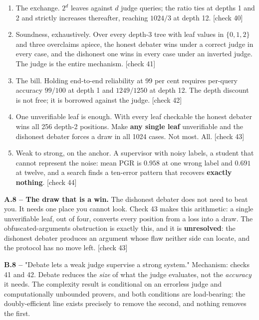 \begin{enumerate}
\item The exchange. $2^d$ leaves against $d$ judge queries; the ratio ties at depths 1 and 2 and strictly increases thereafter, reaching $1024/3$ at depth 12. [check 40]
\item Soundness, exhaustively. Over every depth-3 tree with leaf values in $\{0,1,2\}$ and three overclaims apiece, the honest debater wins under a correct judge in every case, and the dishonest one wins in every case under an inverted judge. The judge is the entire mechanism. [check 41]
\item The bill. Holding end-to-end reliability at 99 per cent requires per-query accuracy $99/100$ at depth 1 and $1249/1250$ at depth 12. The depth discount is not free; it is borrowed against the judge. [check 42]
\item One unverifiable leaf is enough. With every leaf checkable the honest debater wins all 256 depth-2 positions. Make \textbf{any single leaf} unverifiable and the dishonest debater forces a draw in all 1024 cases. Not most. All. [check 43]
\item Weak to strong, on the anchor. A supervisor with noisy labels, a student that cannot represent the noise: mean PGR is $0.958$ at one wrong label and $0.691$ at twelve, and a search finds a ten-error pattern that recovers \textbf{exactly nothing}. [check 44]
\end{enumerate}


\textbf{A.8 -- The draw that is a win.} The dishonest debater does not need to beat you. It needs one place you cannot look. Check 43 makes this arithmetic: a single unverifiable leaf, out of four, converts every position from a loss into a draw. The obfuscated-arguments obstruction is exactly this, and it is \textbf{unresolved}: the dishonest debater produces an argument whose flaw neither side can locate, and the protocol has no move left. [check 43]

\textbf{B.8 --} "Debate lets a weak judge supervise a strong system." Mechanism: checks 41 and 42. Debate reduces the \emph{size} of what the judge evaluates, not the \emph{accuracy} it needs. The complexity result is conditional on an errorless judge and computationally unbounded provers, and both conditions are load-bearing: the doubly-efficient line exists precisely to remove the second, and nothing removes the first.

